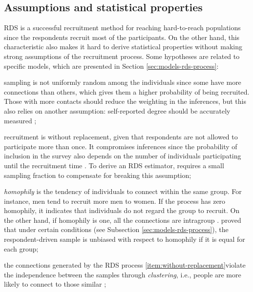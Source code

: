 \subsection{Assumptions and statistical properties}

RDS is a successful recruitment method for reaching hard-to-reach populations
since the respondents recruit most of the participants. On the other hand,
this characteristic also makes it hard to derive statistical properties
without making strong assumptions of the recruitment process.  Some hypotheses
are related to specific models, which are presented in Section
\ref{sec:models-rds-process}:   

\begin{alineas}
  \item sampling is not uniformly random among the individuals since some have more
  connections than others, which gives them a higher probability of being
  recruited. Those with more contacts should reduce the weighting in the
  inferences, but this also relies on another assumption: self-reported degree
  should be accurately measured \cite[p. 297]{gile2010respondent};
  
  \item \label{item:without-replacement} recruitment is without replacement, given that respondents are not
  allowed to participate more than once. It compromises inferences since the
  probability of inclusion in the survey also depends on the number of
  individuals participating until the recruitment time \cite[p.
  299]{gile2010respondent}. To derive an RDS estimator, 
  \textcite[p. 81]{volz2008probability} requires a small sampling fraction to
  compensate for breaking this assumption;

  \item {\em homophily} is the tendency of individuals to connect within the same
  group. For instance, men tend to recruit more men to women. If the process
  has zero homophily, it indicates that individuals do not regard the group to
  recruit. On the other hand, if homophily is one, all the connections are
  intragroup \cite[p. 20]{heckathorn2002}. \textcite[p. 21]{heckathorn2002} proved
  that under certain conditions (see Subsection \ref{sec:models-rds-process}),
  the respondent-driven sample is unbiased with respect to homophily if it is
  equal for each group;

  \item the connections generated by the RDS process  \autoref{item:without-replacement}violate the independence 
  between the samples through {\em clustering}, i.e., people are more likely 
  to connect to those similar \cite[p. 14]{avery2021statistical};
  

\end{alineas}
